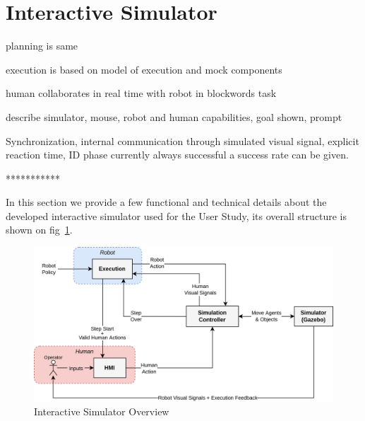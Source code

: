 \section{Interactive Simulator}
planning is same

execution is based on model of execution and mock components

human collaborates in real time with robot in blockwords task

describe simulator, mouse, robot and human capabilities, goal shown, prompt

Synchronization, internal communication through simulated visual signal, explicit reaction time, ID phase currently always successful a success rate can be given. 


***********

In this section we provide a few functional and technical details about the developed interactive simulator used for the User Study, its overall structure is shown on fig~\ref{fig:iteractive_simulator}.

\begin{figure}
    \includegraphics[width=\textwidth]{images/Chapter5/simulator.png}
    \caption{Interactive Simulator Overview}
    \label{fig:iteractive_simulator}
\end{figure}

